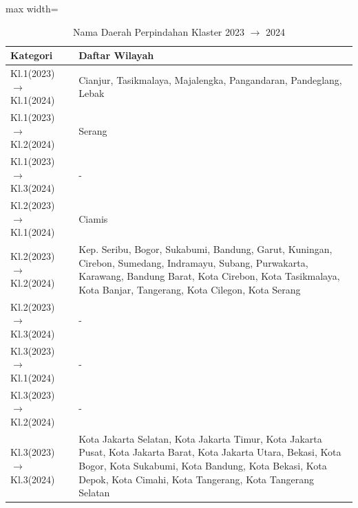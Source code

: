 \begin{table}[H]
\centering
\caption{Nama Daerah Perpindahan Klaster 2023 \(\rightarrow\) 2024} \label{tab:apptransname2023x2024}
\begin{adjustbox}{max width=\textwidth}
\begin{tabular}{|p{4cm}|p{10cm}|}
\hline
\textbf{Kategori} & \textbf{Daftar Wilayah} \\
\hline
Kl.1(2023) \(\rightarrow\) Kl.1(2024) & Cianjur, Tasikmalaya, Majalengka, Pangandaran, Pandeglang, Lebak \\
\hline
Kl.1(2023) \(\rightarrow\) Kl.2(2024) & Serang \\
\hline
Kl.1(2023) \(\rightarrow\) Kl.3(2024) & - \\
\hline
Kl.2(2023) \(\rightarrow\) Kl.1(2024) & Ciamis \\
\hline
Kl.2(2023) \(\rightarrow\) Kl.2(2024) & Kep. Seribu, Bogor, Sukabumi, Bandung, Garut, Kuningan, Cirebon, Sumedang, Indramayu, Subang, Purwakarta, Karawang, Bandung Barat, Kota Cirebon, Kota Tasikmalaya, Kota Banjar, Tangerang, Kota Cilegon, Kota Serang \\
\hline
Kl.2(2023) \(\rightarrow\) Kl.3(2024) & - \\
\hline
Kl.3(2023) \(\rightarrow\) Kl.1(2024) & - \\
\hline
Kl.3(2023) \(\rightarrow\) Kl.2(2024) & - \\
\hline
Kl.3(2023) \(\rightarrow\) Kl.3(2024) & Kota Jakarta Selatan, Kota Jakarta Timur, Kota Jakarta Pusat, Kota Jakarta Barat, Kota Jakarta Utara, Bekasi, Kota Bogor, Kota Sukabumi, Kota Bandung, Kota Bekasi, Kota Depok, Kota Cimahi, Kota Tangerang, Kota Tangerang Selatan \\
\hline
\end{tabular}
\end{adjustbox}
\end{table}